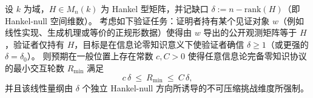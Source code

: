 \begin{conjecture}\label{conj:xi-hankel-gap-zk-round-complexity}
设 \(k\) 为域，\(H\in M_n(k)\) 为 Hankel 型矩阵，并记缺口 \(\delta:=n-\mathrm{rank}(H)\)（即 Hankel-null 空间维数）。
考虑如下验证任务：证明者持有某个见证对象 \(w\)（例如线性实现、生成机理或等价的正规形数据）使得由 \(w\) 导出的公开观测矩阵等于 \(H\)，验证者仅持有 \(H\)，目标是在信息论零知识意义下使验证者确信 \(\delta\ge 1\)（或更强的 \(\delta=\delta_0\)）。
则预期在一般位置上存在常数 \(c,C>0\) 使得任意信息论完备零知识协议的最小交互轮数 \(R_{\min}\) 满足
\[
c\,\delta\ \le\ R_{\min}\ \le\ C\,\delta,
\]
并且该线性量纲由 \(\delta\) 个独立 Hankel-null 方向所诱导的不可压缩挑战维度所强制。
\end{conjecture}

\endinput

